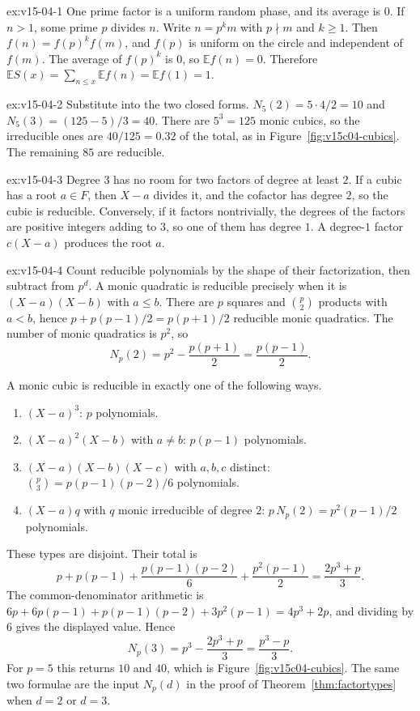 \begin{solution}{ex:v15-04-1}
\idea One prime factor is a uniform random phase, and its average is \(0\).
\writeup If \(n>1\), some prime \(p\) divides \(n\). Write \(n=p^km\) with \(p\nmid m\) and \(k\ge1\). Then \(f(n)=f(p)^kf(m)\), and \(f(p)\) is uniform on the circle and independent of \(f(m)\). The average of \(f(p)^k\) is \(0\), so \(\mathbb Ef(n)=0\). Therefore \(\mathbb ES(x)=\sum_{n\le x}\mathbb Ef(n)=\mathbb Ef(1)=1\).
\end{solution}

\begin{solution}{ex:v15-04-2}
\idea Substitute into the two closed forms.
\writeup \(N_5(2)=5\cdot4/2=10\) and \(N_5(3)=(125-5)/3=40\). There are \(5^3=125\) monic cubics, so the irreducible ones are \(40/125=0.32\) of the total, as in Figure~\ref{fig:v15c04-cubics}. The remaining \(85\) are reducible.
\end{solution}

\begin{solution}{ex:v15-04-3}
\idea Degree \(3\) has no room for two factors of degree at least \(2\).
\writeup If a cubic has a root \(a\in F\), then \(X-a\) divides it, and the cofactor has degree \(2\), so the cubic is reducible. Conversely, if it factors nontrivially, the degrees of the factors are positive integers adding to \(3\), so one of them has degree \(1\). A degree-\(1\) factor \(c(X-a)\) produces the root \(a\).
\end{solution}

\begin{solution}{ex:v15-04-4}
\idea Count reducible polynomials by the shape of their factorization, then subtract from \(p^d\).
\writeup A monic quadratic is reducible precisely when it is \((X-a)(X-b)\) with \(a\le b\). There are \(p\) squares and \(\binom p2\) products with \(a<b\), hence \(p+p(p-1)/2=p(p+1)/2\) reducible monic quadratics. The number of monic quadratics is \(p^2\), so
\[
N_p(2)=p^2-\frac{p(p+1)}2=\frac{p(p-1)}2.
\]

A monic cubic is reducible in exactly one of the following ways.
\begin{enumerate}
\item \((X-a)^3\): \(p\) polynomials.
\item \((X-a)^2(X-b)\) with \(a\ne b\): \(p(p-1)\) polynomials.
\item \((X-a)(X-b)(X-c)\) with \(a,b,c\) distinct: \(\binom p3=p(p-1)(p-2)/6\) polynomials.
\item \((X-a)q\) with \(q\) monic irreducible of degree \(2\): \(p\,N_p(2)=p^2(p-1)/2\) polynomials.
\end{enumerate}
These types are disjoint. Their total is
\[
p+p(p-1)+\frac{p(p-1)(p-2)}6+\frac{p^2(p-1)}2
=\frac{2p^3+p}3.
\]
The common-denominator arithmetic is \(6p+6p(p-1)+p(p-1)(p-2)+3p^2(p-1)=4p^3+2p\), and dividing by \(6\) gives the displayed value.
Hence
\[
N_p(3)=p^3-\frac{2p^3+p}3=\frac{p^3-p}3.
\]
For \(p=5\) this returns \(10\) and \(40\), which is Figure~\ref{fig:v15c04-cubics}. The same two formulae are the input \(N_p(d)\) in the proof of Theorem~\ref{thm:factortypes} when \(d=2\) or \(d=3\).
\end{solution}

